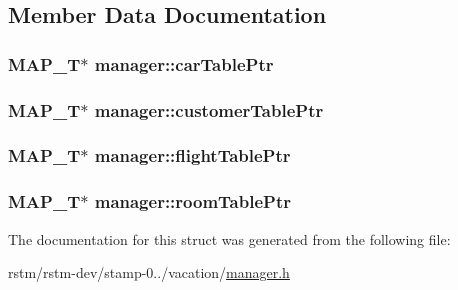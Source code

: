 \subsection{Member Data Documentation}
\hypertarget{structmanager_a3ec323d4689d9385372abdd1dac681b3}{
\subsubsection[{car\-Table\-Ptr}]{\setlength{\rightskip}{0pt plus 5cm}M\-A\-P\-\_\-\-T$\ast$ manager\-::car\-Table\-Ptr}}\label{structmanager_a3ec323d4689d9385372abdd1dac681b3}
\hypertarget{structmanager_aea159e3e4e1a4b7148705067f4f92130}{
\subsubsection[{customer\-Table\-Ptr}]{\setlength{\rightskip}{0pt plus 5cm}M\-A\-P\-\_\-\-T$\ast$ manager\-::customer\-Table\-Ptr}}\label{structmanager_aea159e3e4e1a4b7148705067f4f92130}
\hypertarget{structmanager_a695f3696eaf27977186631aa1e86d4ac}{
\subsubsection[{flight\-Table\-Ptr}]{\setlength{\rightskip}{0pt plus 5cm}M\-A\-P\-\_\-\-T$\ast$ manager\-::flight\-Table\-Ptr}}\label{structmanager_a695f3696eaf27977186631aa1e86d4ac}
\hypertarget{structmanager_a93b909953ff6e31fbf6d9c24f5ccf813}{
\subsubsection[{room\-Table\-Ptr}]{\setlength{\rightskip}{0pt plus 5cm}M\-A\-P\-\_\-\-T$\ast$ manager\-::room\-Table\-Ptr}}\label{structmanager_a93b909953ff6e31fbf6d9c24f5ccf813}


The documentation for this struct was generated from the following file\-:\begin{DoxyCompactItemize}
\item 
rstm/rstm-\/dev/stamp-\/0../vacation/\hyperlink{manager_8h}{manager.\-h}\end{DoxyCompactItemize}
